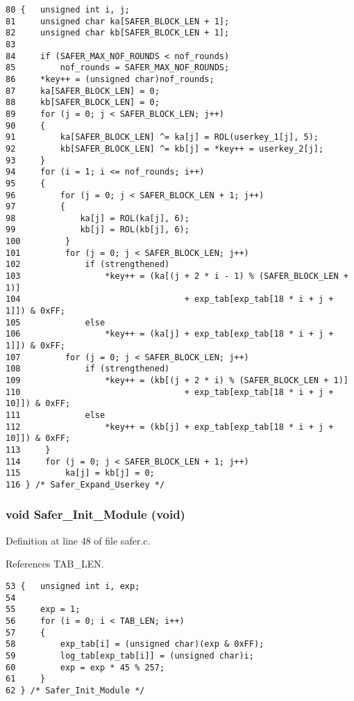 \footnotesize\begin{verbatim}80 {   unsigned int i, j;
81     unsigned char ka[SAFER_BLOCK_LEN + 1];
82     unsigned char kb[SAFER_BLOCK_LEN + 1];
83 
84     if (SAFER_MAX_NOF_ROUNDS < nof_rounds)
85         nof_rounds = SAFER_MAX_NOF_ROUNDS;
86     *key++ = (unsigned char)nof_rounds;
87     ka[SAFER_BLOCK_LEN] = 0;
88     kb[SAFER_BLOCK_LEN] = 0;
89     for (j = 0; j < SAFER_BLOCK_LEN; j++)
90     {
91         ka[SAFER_BLOCK_LEN] ^= ka[j] = ROL(userkey_1[j], 5);
92         kb[SAFER_BLOCK_LEN] ^= kb[j] = *key++ = userkey_2[j];
93     }
94     for (i = 1; i <= nof_rounds; i++)
95     {
96         for (j = 0; j < SAFER_BLOCK_LEN + 1; j++)
97         {
98             ka[j] = ROL(ka[j], 6);
99             kb[j] = ROL(kb[j], 6);
100         }
101         for (j = 0; j < SAFER_BLOCK_LEN; j++)
102             if (strengthened)
103                 *key++ = (ka[(j + 2 * i - 1) % (SAFER_BLOCK_LEN + 1)]
104                                 + exp_tab[exp_tab[18 * i + j + 1]]) & 0xFF;
105             else
106                 *key++ = (ka[j] + exp_tab[exp_tab[18 * i + j + 1]]) & 0xFF;
107         for (j = 0; j < SAFER_BLOCK_LEN; j++)
108             if (strengthened)
109                 *key++ = (kb[(j + 2 * i) % (SAFER_BLOCK_LEN + 1)]
110                                 + exp_tab[exp_tab[18 * i + j + 10]]) & 0xFF;
111             else
112                 *key++ = (kb[j] + exp_tab[exp_tab[18 * i + j + 10]]) & 0xFF;
113     }
114     for (j = 0; j < SAFER_BLOCK_LEN + 1; j++)
115         ka[j] = kb[j] = 0;
116 } /* Safer_Expand_Userkey */
\end{verbatim}\normalsize 
{}
\subsubsection{\setlength{\rightskip}{0pt plus 5cm}void Safer\_\-Init\_\-Module (void)}\label{safer_8c_a8}




Definition at line 48 of file safer.c.

References TAB\_\-LEN.



\footnotesize\begin{verbatim}53 {   unsigned int i, exp;
54 
55     exp = 1;
56     for (i = 0; i < TAB_LEN; i++)
57     {
58         exp_tab[i] = (unsigned char)(exp & 0xFF);
59         log_tab[exp_tab[i]] = (unsigned char)i;
60         exp = exp * 45 % 257;
61     }
62 } /* Safer_Init_Module */
\end{verbatim}\normalsize 
